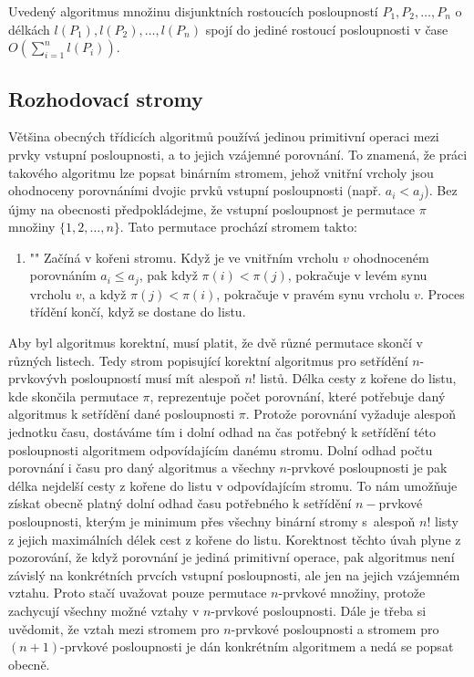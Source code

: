 \documentclass[a4paper,12pt]{article}
\begin{document}
\begin{veta}Uvedený algoritmus množinu 
disjunktních rostoucích 
posloupností $P_1,P_2,\dots,P_n$ o délkách $l(P_1),l(P_2)
,\dots,l(P_n)$ spojí 
do jediné rostoucí posloupnosti v čase 
$O(\sum_{i=1}^nl(P_i))$.
\end{veta}

\subsection{{Rozhodovací stromy}}

Většina obecných třídicích algoritmů 
používá jedinou primitivní operaci mezi prvky vstupní 
posloupnosti, a to jejich vzá\-jemné porov\-nání.  
To znamená, že práci 
takového algoritmu lze po\-psat 
binárním stro\-mem, jehož vnitřní vrcholy jsou ohodnoceny 
porovnáními dvojic prvků vstupní posloupnosti 
(např. $a_i<a_j$). Bez újmy na obecnosti předpokládejme, že 
vstupní posloupnost je permutace $\pi$
množiny $\{1,2,\dots,n\}$. Tato permutace prochází 
stromem takto:
\begin{enumerate}
\item"{}"
Začíná v kořeni stromu. Když je ve vnitřním vrcholu $
v$ 
ohodnoceném porovnáním $a_i\le a_j$, pak když $\pi (i)
<\pi (j)$, 
pokračuje v levém synu vrcholu $v$, a když $\pi (j)<\pi (
i)$, 
pokračuje v pravém synu vrcholu $v$. Proces 
třídění končí, když se dostane do listu.
\end{enumerate}
Aby byl algoritmus korektní, musí platit, že dvě 
různé permutace skončí v různých 
listech.  Tedy strom popisující korektní algoritmus 
pro setřídění $n$-prvkovývh posloupností musí mít 
alespoň $n!$ listů.  Délka cesty z kořene do listu, 
kde skončila permutace $\pi$, reprezentuje počet porovnání, které potřebuje 
daný algoritmus k setřídění dané posloupnosti $
\pi$. Protože porovnání 
vyžaduje alespoň jednotku času, dostáváme tím i dolní odhad na 
čas potřebný k setřídění této posloupnosti  algoritmem 
odpovídajícím danému stromu. Dolní odhad  počtu 
porovnání i času pro daný algoritmus a všechny  
$n$-prvkové posloupnosti je pak délka nejdelší cesty z kořene 
do listu v odpovídajícím stromu. To nám umožňuje 
získat obecně platný dolní odhad času potřebného k setřídění 
$n-$prvkové posloupnosti, kterým je  
minimum přes všechny binární stromy s~alespoň $n!$ 
listy z jejich maximálních délek cest z kořene do listu. 
Korekt\-nost těchto úvah plyne z pozorování, 
že když porovnání je jediná primi\-tivní operace, pak 
algoritmus není závislý na konkrétních prvcích vstup\-ní 
posloupnosti, ale jen na jejich vzájemném vzta\-hu. 
Proto stačí uvažovat pouze permutace $n$-prvkové množiny, 
protože za\-chycují všechny možné vztahy v $n$-prvkové 
posloupnosti. Dá\-le je třeba si uvědomit, že vztah mezi 
stromem pro $n$-prvkové posloupnosti a stromem pro 
$(n+1)$-prvkové posloupnosti je dán konkrétním algoritmem a 
nedá se popsat obecně. 
\end{document}
